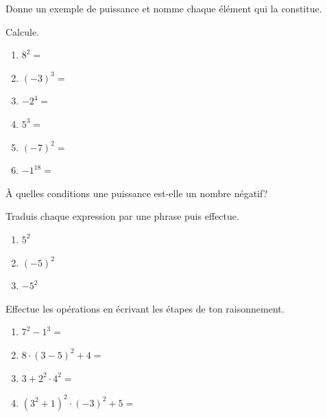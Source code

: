 \documentclass[../../syllabus_2.tex]{subfiles}
\begin{document}
\begin{exercise}
	Donne un exemple de puissance et nomme chaque élément qui la constitue.
	\vspace*{3cm}
\end{exercise}
\begin{exercise}
	Calcule.
	\begin{enumerate}[cols=3, itemsep=1.8em]
		\item  \(8^2=\)
		\item \((-3)^3=\)
		\item \(-2^4=\)
		\item \(5^3=\)
		\item \(\left(-7\right)^2=\)
		\item \(-1^{18}=\)
	\end{enumerate}
\end{exercise}
\begin{exercise}
	À quelles conditions une puissance est-elle un nombre négatif?
	\vspace{2cm}
\end{exercise}

\begin{exercise}
	Traduis chaque expression par une phrase puis effectue.
	\begin{enumerate}[itemsep=2cm]
		\item \(5^2\)
		\item \((-5)^2\)
		\item \(-5^2\)
	\end{enumerate}
\end{exercise}

\begin{exercise}
	Effectue les opérations en écrivant les étapes de ton raisonnement.
	\begin{enumerate}[cols=2, itemsep=2cm]
		\item \(7^2 - 1^3=\)
		\item \(8\cdot(3-5)^2+4=\)
		\item \(3+2^2\cdot4^2=\)
		\item \(\left( 3^2 + 1 \right)^2 \cdot (-3)^2 + 5=\)
	\end{enumerate}
\end{exercise}
\end{document}
